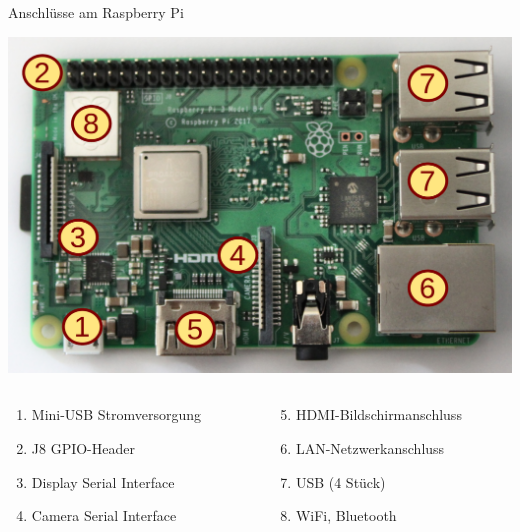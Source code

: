 \begin{frame}{Anschlüsse am Raspberry Pi}
        \begin{center}
            \includegraphics[height=0.5\textheight]{2-hardwaredesign/img/raspberry_anschluesse}
        \end{center}

        \smallskip

        \begin{columns}
            \begin{column}[T]{.5\textwidth}
                \begin{enumerate}
                    \item Mini-USB Stromversorgung
                    \item J8 GPIO-Header
                    \item Display Serial Interface
                    \item Camera Serial Interface
                \end{enumerate}
            \end{column}
            \begin{column}[T]{.5\textwidth}
                \begin{enumerate}
                    \setcounter{enumi}{4}   %
                    \item HDMI-Bildschirmanschluss
                    \item LAN-Netzwerkanschluss
                    \item USB (4 Stück)
                    \item WiFi, Bluetooth
                \end{enumerate}
            \end{column}
        \end{columns}
\end{frame}

